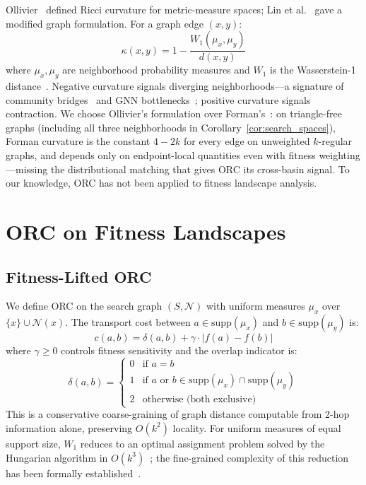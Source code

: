 \documentclass[runningheads]{llncs}
\begin{document}
Ollivier~\cite{ollivier2009ricci} defined Ricci curvature for metric-measure spaces; Lin et al.~\cite{lin2011ricci} gave a modified graph formulation.
For a graph edge $(x, y)$:
\begin{equation}
\label{eq:orc}
\kappa(x, y) = 1 - \frac{W_1(\mu_x, \mu_y)}{d(x, y)}
\end{equation}
where $\mu_x, \mu_y$ are neighborhood probability measures and $W_1$ is the Wasserstein-1 distance~\cite{villani2009optimal}.
Negative curvature signals diverging neighborhoods---a signature of community bridges~\cite{ni2019community} and GNN bottlenecks~\cite{topping2022understanding,sandhu2015graph}; positive curvature signals contraction.
We choose Ollivier's formulation over Forman's~\cite{samal2018comparative}: on triangle-free graphs (including all three neighborhoods in Corollary~\ref{cor:search_spaces}), Forman curvature is the constant $4\!-\!2k$ for every edge on unweighted $k$-regular graphs, and depends only on endpoint-local quantities even with fitness weighting---missing the distributional matching that gives ORC its cross-basin signal.
To our knowledge, ORC has not been applied to fitness landscape analysis.


\section{ORC on Fitness Landscapes}
\label{sec:method}

\subsection{Fitness-Lifted ORC}

We define ORC on the search graph $(S, \mathcal{N})$ with uniform measures $\mu_x$ over $\{x\} \cup \mathcal{N}(x)$.
The transport cost between $a \in \mathrm{supp}(\mu_x)$ and $b \in \mathrm{supp}(\mu_y)$ is:
\begin{equation}
\label{eq:lifted}
c(a, b) = \delta(a, b) + \gamma \cdot |f(a) - f(b)|
\end{equation}
where $\gamma \ge 0$ controls fitness sensitivity and the overlap indicator is:
\begin{equation}
\label{eq:overlap}
\delta(a, b) = \begin{cases} 0 & \text{if } a = b \\ 1 & \text{if } a \text{ or } b \in \mathrm{supp}(\mu_x) \cap \mathrm{supp}(\mu_y) \\ 2 & \text{otherwise (both exclusive)} \end{cases}
\end{equation}
This is a conservative coarse-graining of graph distance computable from 2-hop information alone, preserving $O(k^2)$ locality.
For uniform measures of equal support size, $W_1$ reduces to an optimal assignment problem solved by the Hungarian algorithm in $O(k^3)$~\cite{kuhn1955hungarian}; the fine-grained complexity of this reduction has been formally established~\cite{dasgupta2023computing}.
\end{document}
